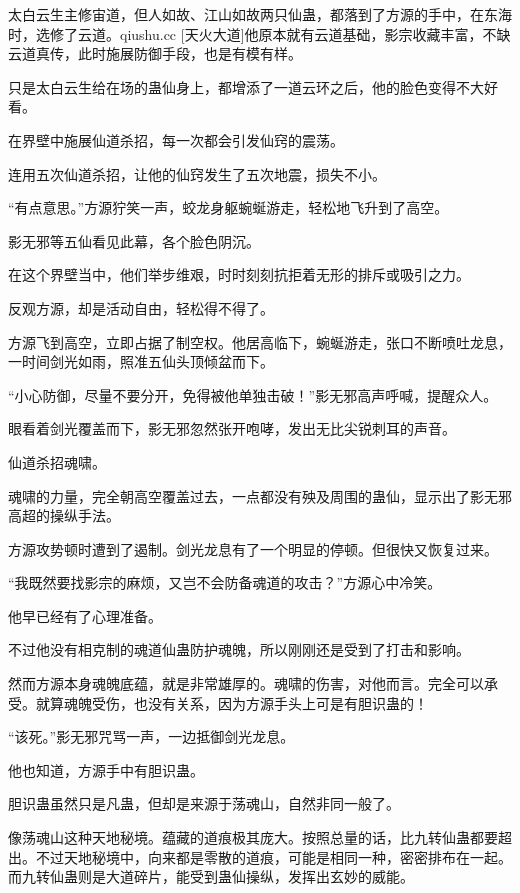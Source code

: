 
\begin{this_body}

太白云生主修宙道，但人如故、江山如故两只仙蛊，都落到了方源的手中，在东海时，选修了云道。qiushu.cc [天火大道]他原本就有云道基础，影宗收藏丰富，不缺云道真传，此时施展防御手段，也是有模有样。

只是太白云生给在场的蛊仙身上，都增添了一道云环之后，他的脸色变得不大好看。

在界壁中施展仙道杀招，每一次都会引发仙窍的震荡。

连用五次仙道杀招，让他的仙窍发生了五次地震，损失不小。

“有点意思。”方源狞笑一声，蛟龙身躯蜿蜒游走，轻松地飞升到了高空。

影无邪等五仙看见此幕，各个脸色阴沉。

在这个界壁当中，他们举步维艰，时时刻刻抗拒着无形的排斥或吸引之力。

反观方源，却是活动自由，轻松得不得了。

方源飞到高空，立即占据了制空权。他居高临下，蜿蜒游走，张口不断喷吐龙息，一时间剑光如雨，照准五仙头顶倾盆而下。

“小心防御，尽量不要分开，免得被他单独击破！”影无邪高声呼喊，提醒众人。

眼看着剑光覆盖而下，影无邪忽然张开咆哮，发出无比尖锐刺耳的声音。

仙道杀招魂啸。

魂啸的力量，完全朝高空覆盖过去，一点都没有殃及周围的蛊仙，显示出了影无邪高超的操纵手法。

方源攻势顿时遭到了遏制。剑光龙息有了一个明显的停顿。但很快又恢复过来。

“我既然要找影宗的麻烦，又岂不会防备魂道的攻击？”方源心中冷笑。

他早已经有了心理准备。

不过他没有相克制的魂道仙蛊防护魂魄，所以刚刚还是受到了打击和影响。

然而方源本身魂魄底蕴，就是非常雄厚的。魂啸的伤害，对他而言。完全可以承受。就算魂魄受伤，也没有关系，因为方源手头上可是有胆识蛊的！

“该死。”影无邪咒骂一声，一边抵御剑光龙息。

他也知道，方源手中有胆识蛊。

胆识蛊虽然只是凡蛊，但却是来源于荡魂山，自然非同一般了。

像荡魂山这种天地秘境。蕴藏的道痕极其庞大。按照总量的话，比九转仙蛊都要超出。不过天地秘境中，向来都是零散的道痕，可能是相同一种，密密排布在一起。而九转仙蛊则是大道碎片，能受到蛊仙操纵，发挥出玄妙的威能。


\end{this_body}
